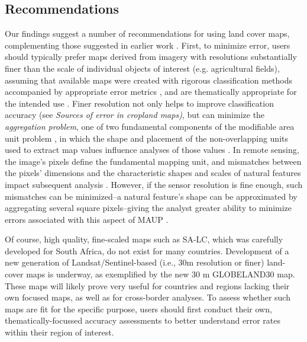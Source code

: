 \documentclass[a4paper]{article}
\begin{document}
\subsection*{Recommendations}
\vspace{-0.2 cm}
Our findings suggest a number of recommendations for using land cover maps, complementing those suggested in earlier work \citep{verburg_challenges_2011}. First, to minimize error, users should typically prefer maps derived from imagery with resolutions substantially finer than the scale of individual objects of interest (e.g. agricultural fields), assuming that available maps were created with rigorous classification methods accompanied by appropriate error metrics \citep{olofsson_good_2014}, and are thematically appropriate for the intended use \citep{verburg_challenges_2011}. Finer resolution not only helps to improve classification accuracy (see \emph{Sources of error in cropland maps)}, but can minimize the \emph{aggregation problem}, one of two fundamental components of the modifiable area unit problem \citep[MAUP; ][]{openshaw_million_1979}, in which the shape and placement of the non-overlapping units used to extract map values influence analyses of those values \citep{dark_modifiable_2007, marceau_scale_1999}. In remote sensing, the image's pixels define the fundamental mapping unit, and mismatches between the pixels' dimensions and the characteristic shapes and scales of natural features impact subsequent analysis \citep{dark_modifiable_2007}. However, if the sensor resolution is fine enough, such mismatches can be minimized--a natural feature's shape can be approximated by aggregating several square pixels--giving the analyst greater ability to minimize errors associated with this aspect of MAUP \citep{dark_modifiable_2007, hay_comparison_2003}. 

Of course, high quality, fine-scaled maps such as SA-LC, which was carefully developed for South Africa, do not exist for many countries. Development of a new generation of Landsat/Sentinel-based (i.e., 30m resolution or finer) land-cover maps is underway, as exemplified by the new 30 m GLOBELAND30 map. These maps will likely prove very useful for countries and regions lacking their own focused maps, as well as for cross-border analyses. To assess whether such maps are fit for the specific purpose, users should first conduct their own, thematically-focussed accuracy assessments to better understand error rates within their region of interest. %
\end{document}
